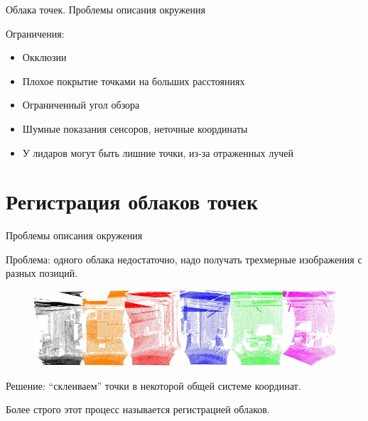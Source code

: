 \documentclass[6pt,pdf,utf8,russian]{beamer}
\begin{document}
\begin{frame}[fragile]{Облака точек. Проблемы описания окружения}
    \begin{block}{}
        Ограничения:
        \begin{itemize}
            \item Окклюзии
            \item Плохое покрытие точками на больших расстояниях
            \item Ограниченный угол обзора
            \item Шумные показания сенсоров, неточные координаты
            \item У лидаров могут быть лишние точки, из-за отраженных лучей
        \end{itemize}
    \end{block}

\end{frame}

\section{Регистрация облаков точек}

\begin{frame}[fragile]{Проблемы описания окружения}

    \begin{block}{}
        Проблема: одного облака недостаточно, надо получать трехмерные изображения с разных позиций.
    \end{block}

    \pause

    \begin{figure}
        \includegraphics[width=\textwidth]{images/multiple_point_clouds.jpg}
    \end{figure}

    \pause

    \begin{block}{}
        Решение: ``склеиваем'' точки в некоторой общей системе координат.

        Более строго этот процесс называется регистрацией облаков.
    \end{block}
\end{frame}
\end{document}
